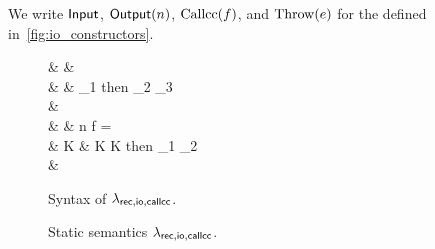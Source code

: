 We write $\mathsf{Input}$, $\mathsf{Output}(n)$, $\mathrm{Callcc}(f)$, and $\mathrm{Throw}(e)$ for
the \gitrees defined in~\cref{fig:io_constructors}.

\begin{figure}
  \begin{grammar}
     & \tau & \tnat \mid {} \mid \tcont{\tau} \\
     & \expr & \val \mid \var \mid {} \mid {} \mid \Input \mid \Output \expr \mid \If \expr_1 then \expr_2 \Else \expr_3 \\
    \GrmContinue & \mid \callcc{\var}{\expr} \mid {} \\
     & \val & n \mid \Rec f \var = \expr \mid {} \\
     & K & \emptyK \mid \Output K \mid \If K then \expr_1 \Else \expr_2 \mid {} \mid {} \mid {} \mid {} \\
    \GrmContinue & \mid {} \mid {}
  \end{grammar}
  \caption{Syntax of $\lambda_{\mathsf{rec},\mathsf{io,callcc}}$.}
  \label{fig:syn_lang}
\end{figure}

\begin{figure}
  \caption{Static semantics $\lambda_{\mathsf{rec},\mathsf{io,callcc}}$.}
  \label{fig:stat_sem_lang}
\end{figure}

